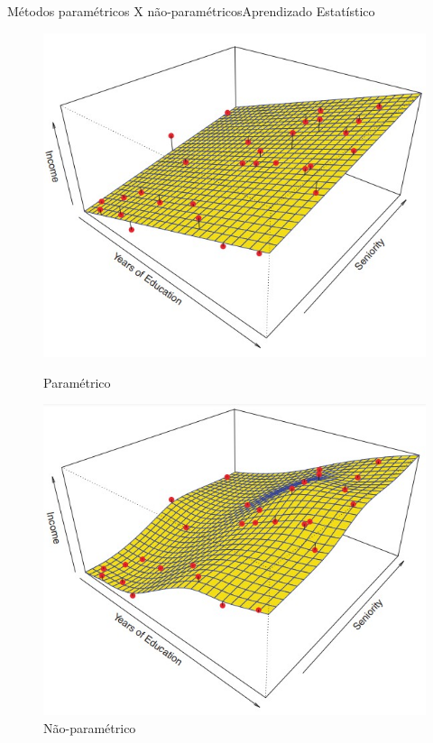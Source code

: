 \documentclass[t]{beamer}
\begin{document}
\begin{ftst}{Métodos paramétricos X não-paramétricos}{{Aprendizado Estatístico}}
\vone
\vone
\begin{figure}[!htb]
    \centering
    \begin{minipage}{.5\textwidth}
        \centering
        \includegraphics[scale=0.3]{Figuras/slide03_08.jpg}
        \caption{Paramétrico}
        \label{fig:01}
    \end{minipage}%
    \begin{minipage}{0.5\textwidth}
        \centering
        \includegraphics[scale=0.3]{Figuras/slide03_09.jpg}
        \caption{Não-paramétrico}
        \label{fig:02}
    \end{minipage}
\end{figure}

\end{ftst}
\end{document}
